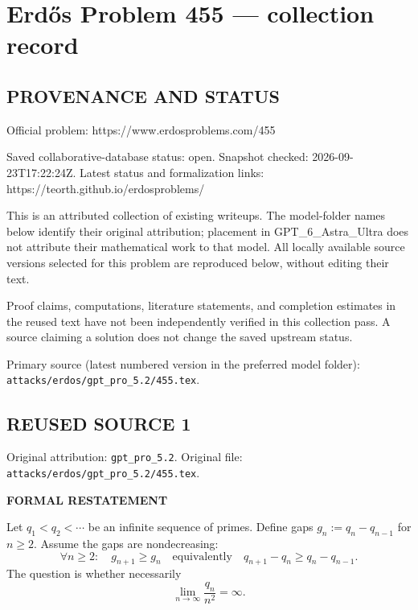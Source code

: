 \section*{Erd\H{o}s Problem 455 --- collection record}

\subsection*{PROVENANCE AND STATUS}
Official problem: https://www.erdosproblems.com/455

Saved collaborative-database status: open.
Snapshot checked: 2026-09-23T17:22:24Z.
Latest status and formalization links: https://teorth.github.io/erdosproblems/

This is an attributed collection of existing writeups. The model-folder names below identify their original attribution; placement in GPT\_6\_Astra\_Ultra does not attribute their mathematical work to that model. All locally available source versions selected for this problem are reproduced below, without editing their text.

Proof claims, computations, literature statements, and completion estimates in the reused text have not been independently verified in this collection pass. A source claiming a solution does not change the saved upstream status.

Primary source (latest numbered version in the preferred model folder): \texttt{attacks/erdos/gpt\_pro\_5.2/455.tex}.

\subsection*{REUSED SOURCE 1}
Original attribution: \texttt{gpt\_pro\_5.2}.
Original file: \texttt{attacks/erdos/gpt\_pro\_5.2/455.tex}.


\textbf{FORMAL RESTATEMENT}

Let $q_1<q_2<\cdots$ be an infinite sequence of primes. Define gaps $g_n:=q_n-q_{n-1}$ for $n\ge 2$.
Assume the gaps are nondecreasing:
\[
\forall n\ge 2:\quad g_{n+1}\ge g_n\quad\text{equivalently}\quad q_{n+1}-q_n\ge q_n-q_{n-1}.
\]
The question is whether necessarily
\[
\lim_{n\to\infty}\frac{q_n}{n^2}=\infty.
\]

